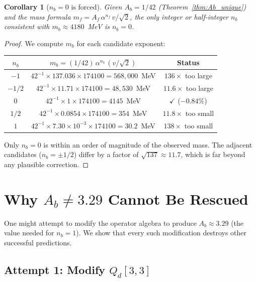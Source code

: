 \documentclass[11pt,a4paper]{article}
\newtheorem{corollary}[theorem]{Corollary}
\theoremstyle{definition}
\theoremstyle{remark}
\begin{document}
\begin{corollary}[$n_b = 0$ is forced]
\label{cor:nb_zero}
Given $A_b = 1/42$ (Theorem~\ref{thm:Ab_unique}) and the mass formula
$m_f = A_f\,\alpha^{n_f}\,v/\sqrt{2}$, the only integer or half-integer
$n_b$ consistent with $m_b \approx 4180$~MeV is $n_b = 0$.
\end{corollary}

\begin{proof}
We compute $m_b$ for each candidate exponent:
\begin{center}
\begin{tabular}{ccc}
\toprule
$n_b$ & $m_b = (1/42)\,\alpha^{n_b}\,(v/\sqrt{2})$ & Status \\
\midrule
$-1$ & $42^{-1} \times 137.036 \times 174100 = 568{,}000$~MeV & $136\times$ too large \\
$-1/2$ & $42^{-1} \times 11.71 \times 174100 = 48{,}530$~MeV & $11.6\times$ too large \\
$0$ & $42^{-1} \times 1 \times 174100 = 4145$~MeV & {\color{proven}$\checkmark$ ($-0.84\%$)} \\
$1/2$ & $42^{-1} \times 0.0854 \times 174100 = 354$~MeV & $11.8\times$ too small \\
$1$ & $42^{-1} \times 7.30 \times 10^{-3} \times 174100 = 30.2$~MeV & $138\times$ too small \\
\bottomrule
\end{tabular}
\end{center}
Only $n_b = 0$ is within an order of magnitude of the observed mass.
The adjacent candidates ($n_b = \pm 1/2$) differ by a factor of $\sqrt{137}
\approx 11.7$, which is far beyond any plausible correction.
\end{proof}

\section{Why $A_b \neq 3.29$ Cannot Be Rescued}
\label{sec:rescue}

One might attempt to modify the operator algebra to produce $A_b \approx 3.29$
(the value needed for $n_b = 1$).  We show that every such modification
destroys other successful predictions.

\subsection{Attempt 1: Modify $Q_d[3,3]$}
\end{document}
